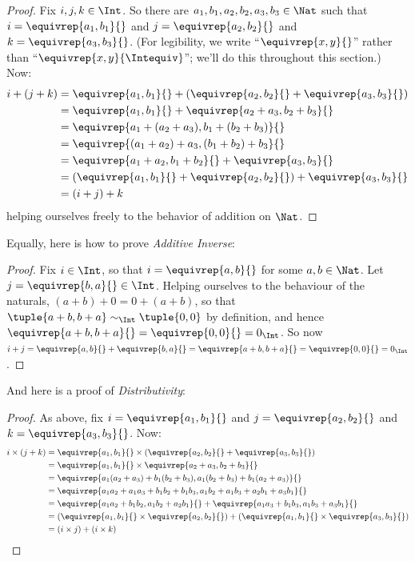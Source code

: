 \documentclass[../../../include/open-logic-section]{subfiles}
\begin{document}
\begin{proof} 
Fix $i, j, k \in \Int$. So there are $a_1, b_1, a_2, b_2, a_3, b_3 \in
\Nat$ such that $i = \equivrep{a_1, b_1}{}$ and $j =
\equivrep{a_2,b_2}{}$ and $k = \equivrep{a_3, b_3}{}$. (For
legibility, we write ``$\equivrep{x, y}{}$'' rather than
``$\equivrep{x, y}{\Intequiv}$''; we'll do this throughout this
section.) Now:
\begin{align*}
	i + (j + k) &= \equivrep{a_1, b_1}{}+(\equivrep{a_2, b_2}{} + \equivrep{a_3, b_3}{}) \\
	&= \equivrep{a_1,  b_1}{} + \equivrep{a_2+a_3, b_2+b_3}{}\\
	&= \equivrep{a_1 + (a_2 + a_3), b_1 + (b_2 + b_3)}{}\\
	&= \equivrep{(a_1 + a_2) + a_3, (b_1 + b_2) + b_3}{}\\
	&= \equivrep{a_1 + a_2, b_1 + b_2}{} + \equivrep{a_3, b_3}{}\\
	&= (\equivrep{a_1, b_1}{} + \equivrep{a_2, b_2}{}) + \equivrep{a_3, b_3}{}\\
	&= (i+j) + k
\end{align*}
helping ourselves freely to the behavior of addition on $\Nat$.
\end{proof}

Equally, here is how to prove \emph{Additive Inverse}:

\begin{proof}
Fix $i \in \Int$, so that $i = \equivrep{a,b}{}$ for some $a,b \in
\Nat$. Let $j = \equivrep{b,a}{} \in \Int$. Helping ourselves to the
behaviour of the naturals, $(a+b) + 0 = 0 + (a+b)$, so that
$\tuple{a+b, b+a} \sim_\Int \tuple{0,0}$ by definition, and hence
$\equivrep{a+b, b+a}{} = \equivrep{0, 0}{} = 0_\Int$. So now $i + j =
\equivrep{a,b}{}+\equivrep{b,a}{}=\equivrep{a+b, b+a}{}= \equivrep{0,
0}{} = 0_\Int$.
\end{proof}

And here is a proof of \emph{Distributivity}:

\begin{proof}
As above, fix $i = \equivrep{a_1, b_1}{}$ and $j =
\equivrep{a_2,b_2}{}$ and $k = \equivrep{a_3, b_3}{}$. Now:
\begin{align*}
	i \times (j + k) 
	&= \equivrep{a_1, b_1}{} \times (\equivrep{a_2,b_2}{} + \equivrep{a_3, b_3}{})\\
	&= \equivrep{a_1, b_1}{} \times \equivrep{a_2 + a_3,b_2+b_3}{}\\
	&= \equivrep{a_1  (a_2 + a_3) + b_1  (b_2+b_3), a_1  (b_2 + b_3) + b_1 (a_2 + a_3)}{}\\
	&= \equivrep{a_1 a_2 + a_1a_3 + b_1 b_2+b_1b_3, a_1 b_2 + a_1b_3 + a_2b_1 + a_3b_1}{}\\		
	&= \equivrep{a_1a_2 + b_1b_2, a_1b_2 + a_2b_1}{} + \equivrep{a_1a_3 + b_1b_3, a_1b_3 + a_3b_1}{}\\
	&= (\equivrep{a_1, b_1}{} \times \equivrep{a_2,b_2}{}) + (\equivrep{a_1, b_1}{} \times  \equivrep{a_3, b_3}{})\\
	&= (i \times j) + (i \times k)
\end{align*}
\end{proof}
\end{document}
